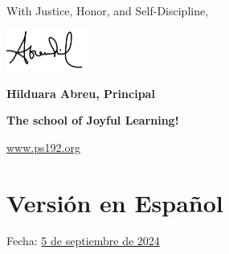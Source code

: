 \documentclass[letterpaper, 12pt]{article}
\begin{document}
With Justice, Honor, and Self-Discipline,

\includegraphics[width=0.2\textwidth]{hil_signature}

\textbf{Hilduara Abreu, Principal}

\textbf{The school of Joyful Learning!}

\href{www.ps192.org}{www.ps192.org}

\pagebreak
\vspace*{-1cm}

\section*{Versión en Español}
\label{sec:orgfecdfee}
Fecha: \href{https://www.ps192.org}{5 de septiembre de 2024}
\end{document}
